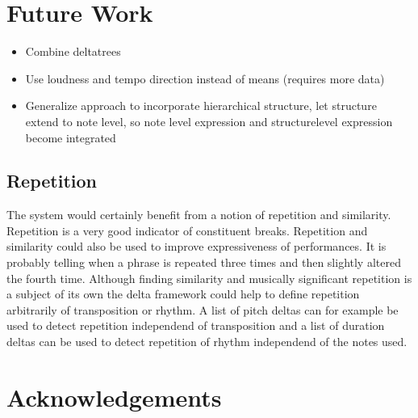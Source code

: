 \documentclass[a4paper,10pt]{article}
\begin{document}
\section{Future Work}
\begin{itemize}
\item Combine deltatrees
\item Use loudness and tempo direction instead of means (requires more data)
\item Generalize approach to incorporate hierarchical structure, let structure extend to note level, so note level expression and structurelevel expression become integrated
\end{itemize}
\subsection{Repetition}
The system would certainly benefit from a notion of repetition and similarity. Repetition is a very good indicator of constituent breaks. Repetition and similarity could also be used to improve expressiveness of performances. It is probably telling when a phrase is repeated three times and then slightly altered the fourth time. Although finding similarity and musically significant repetition is a subject of its own the delta framework could help to define repetition arbitrarily of transposition or rhythm. A list of pitch deltas can for example be used to detect repetition independend of transposition and a list of duration deltas can be used to detect repetition of rhythm independend of the notes used. 

\section{Acknowledgements}

  
 
 
\end{document}
